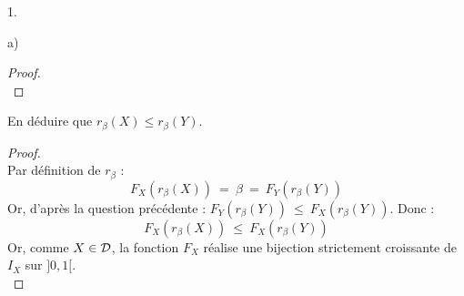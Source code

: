 \documentclass[11pt]{article}%
\begin{document}
\begin{noliste}{1.}
\begin{noliste}{a)}
\begin{proof}
      ~\\[-1.4cm]
    \end{proof}

    
    \item En déduire que $r_\beta(X) \leq r_\beta(Y)$. 
    
    \begin{proof}~\\
      Par définition de $r_\beta$ :
      \[
        F_X(r_\beta(X)) \ = \ \beta \ = \
        F_Y(r_\beta(Y))
      \]
      Or, d'après la question précédente : $F_Y(r_\beta(Y)) \ \leq 
      \ F_X(r_\beta(Y))$. Donc :
      \[
        F_X(r_\beta(X)) \ \leq \ F_X(r_\beta(Y))
      \]
      Or, comme $X \in {\cal D}$, la fonction $F_X$ réalise une 
      bijection strictement croissante de $I_X$ sur $]0,1[$.
      ~\\[-1cm]
    \end{proof}
  \end{noliste}
\end{noliste}


\end{document}
